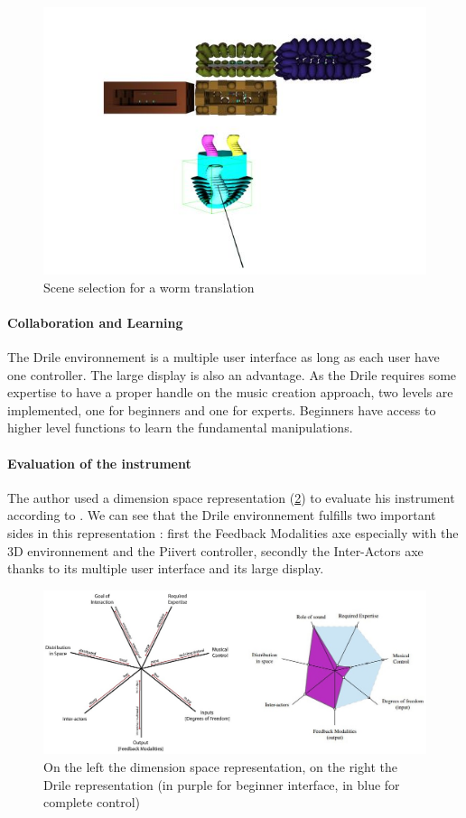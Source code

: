 \begin{figure}[h!]
\centering\includegraphics[scale=0.55]{image/scenes.JPG}
\caption{Scene selection for a worm translation}
\label{fig:scene}
\end{figure} 

\paragraph{Collaboration and Learning}

The Drile environnement is a multiple user interface as long as each user have one controller. The large display is also an advantage. As the Drile requires some expertise to have a proper handle on the music creation approach, two levels are implemented, one for beginners and one for experts. Beginners have access to higher level functions to learn the fundamental manipulations.

\paragraph{Evaluation of the instrument}

The author used a dimension space representation (\ref{fig:classinstr}) to evaluate his instrument according to \cite{birnbaum2005towards}. We can see that the Drile environnement fulfills two important sides in this representation : first the Feedback Modalities axe especially with the 3D environnement and the Piivert controller, secondly the Inter-Actors axe thanks to its multiple user interface and its large display.

\begin{figure}[h!]
\centering\includegraphics[scale=0.55]{image/classification_new_instr.jpg}
\caption{On the left the dimension space representation,
on the right the Drile representation (in purple for beginner interface, in blue for complete control)}
\label{fig:classinstr}
\end{figure} 


